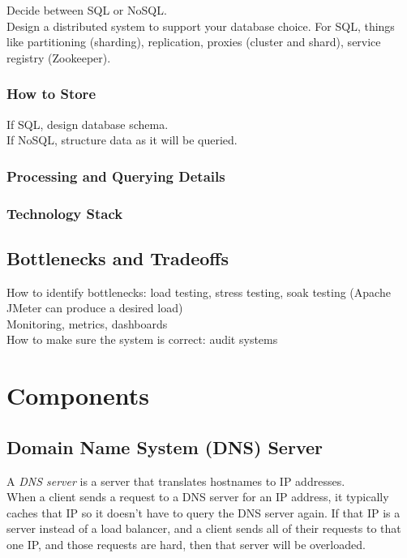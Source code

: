 \documentclass[12pt, titlepage]{article}
\begin{document}
Decide between SQL or NoSQL. \\

Design a distributed system to support your database choice. For SQL, things like partitioning (sharding), replication, proxies (cluster and shard), service registry (Zookeeper).

\subsubsection{How to Store}

If SQL, design database schema. \\
If NoSQL, structure data as it will be queried.

\subsubsection{Processing and Querying Details}

\subsubsection{Technology Stack}

\subsection{Bottlenecks and Tradeoffs}

How to identify bottlenecks: load testing, stress testing, soak testing (Apache JMeter can produce a desired load) \\

Monitoring, metrics, dashboards \\

How to make sure the system is correct: audit systems \\

\section{Components}

\subsection{Domain Name System (DNS) Server}

A \textit{DNS server} is a server that translates hostnames to IP addresses. \\

When a client sends a request to a DNS server for an IP address, it typically caches that IP so it doesn't have to query the DNS server again. If that IP is a server instead of a load balancer, and a client sends all of their requests to that one IP, and those requests are hard, then that server will be overloaded.
\end{document}
